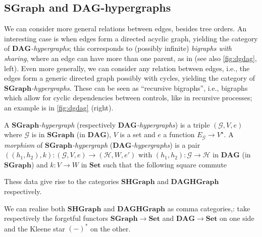\documentclass[runningheads,envcountsect]{lmcs}
\newcommand{\dgr}{\catname{SGraph}}
\newcommand{\dg}{\catname{DAG}}
\newcommand{\catname}[1]{\mathbf{#1}}
\theoremstyle{plain}
\theoremstyle{definition}
\begin{document}
 \subsection{$\dgr$ and $\dg$-hypergraphs}
 We can consider more general relations between edges, besides tree orders.
 An interesting case is when edges form a directed acyclic graph, yielding the category of \emph{$\dg$-hypergraphs}; this corresponds to (possibly infinite) \emph{bigraphs with sharing}, where an edge can have more than one parent, as in \cite{sc:bigraphsharing} (see also \cref{fig:dgdag}, left).
 Even more generally, we can consider any relation between edges, i.e., the edges form a generic directed graph possibly with cycles, yielding the category of \emph{$\dgr$-hypergraphs}. These can be seen as ``recursive bigraphs'', i.e., bigraphs which allow for cyclic dependencies between controls, like in recursive processes; an example is in \cref{fig:dgdag} (right).
 
 

\begin{defi} A \emph{$\dgr$-hypergraph} (respectively \emph{$\dg$-hypergraphs}) is a triple
	$(\mathcal{G}, V, e)$ where $\mathcal{G}$ is in $\dgr$ (in $\dg$), $V$ is a set and $e$ a function $E_\mathcal{G}\rightarrow V^{\star}$. A \emph{morphism} of \emph{$\dgr$-hypergraph} (\emph{$\dg$-hypergraphs}) is a pair $((h_1, h_2),k):(\mathcal{G}, V, e)\rightarrow (\mathcal{H}, W, e')$ with $(h_1, h_2):\mathcal{G}\rightarrow \mathcal{H}$ in $\dg$ (in $\dgr$) and $k:V\rightarrow W$ in $\catname{Set}$ such that the following square commute
	\begin{center}
	\end{center}
Thess data give rise to the categories $\catname{SHGraph}$ and $\catname{DAGHGraph}$ respectively.
\end{defi}

We can realise both $\catname{SHGraph}$ and $\catname{DAGHGraph}$ as comma categories,: take respectively the forgetful functors $\dgr\rightarrow \catname{Set}$ and $\dg \rightarrow \catname{Set}$ on one side and the Kleene star $(-)^\ast$ on the other.
\end{document}
